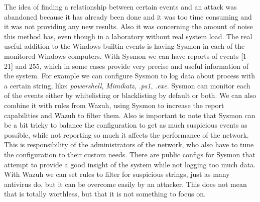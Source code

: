 \linej
\linej
The idea of finding a relationship between certain events and an attack was abandoned because it has already been done\cite{sysmon_event_7_mimikatz} and it was too time consuming and it was not providing any new results. Also it was concerning the amount of noise this method has, even though in a laboratory without real system load.
\linej
\linej
The real useful addition to the Windows builtin events is having Sysmon\cite{sysmon} in each of the monitored Windows computers.
With Sysmon we can have reports of events [1-21] and 255, which in some cases provide very precise and useful information of the system. For example we can configure Sysmon to log data about process with a certain string, like: \textit{powershell}, \textit{Mimikatz}, \textit{.ps1}, \textit{.exe}.
Sysmon can monitor each of the events either by whitelisting or blacklisting by default or both. We can also combine it with rules from Wazuh, using Sysmon to increase the report capabilities and Wazuh to filter them.
\linej
\linej
Also is important to note that Sysmon can be a bit tricky to balance the configuration to get as much suspicious events as possible, while not reporting so much it affects the performance of the network. This is responsibility of the administrators of the network, who also have to tune the configuration to their custom needs.
There are public configs for Sysmon that attempt to provide a good insight of the system while not logging too much data\cite{sysmon_config}.
\linej
With Wazuh we can set rules to filter for suspicious strings, just as many antivirus do, but it can be overcome easily by an attacker. This does not mean that is totally worthless, but that it is not something to focus on.

